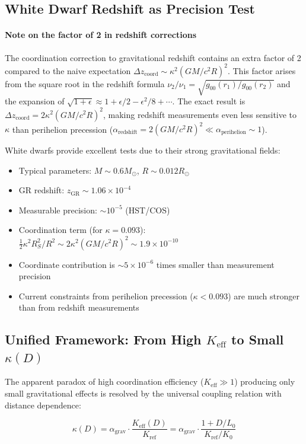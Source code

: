 \documentclass[11pt,a4paper]{article}
\begin{document}
	\subsection{White Dwarf Redshift as Precision Test}
	\paragraph{Note on the factor of 2 in redshift corrections}
	The coordination correction to gravitational redshift contains an extra factor of 2 compared to the naive expectation $\Delta z_{\text{coord}} \sim \kappa^2 (GM/c^2R)^2$. This factor arises from the square root in the redshift formula $\nu_2/\nu_1 = \sqrt{g_{00}(r_1)/g_{00}(r_2)}$ and the expansion of $\sqrt{1 + \epsilon} \approx 1 + \epsilon/2 - \epsilon^2/8 + \cdots$. The exact result is $\Delta z_{\text{coord}} = 2\kappa^2 (GM/c^2R)^2$, making redshift measurements even less sensitive to $\kappa$ than perihelion precession ($\alpha_{\text{redshift}} = 2(GM/c^2R)^2 \ll \alpha_{\text{perihelion}} \sim 1$).
	
	White dwarfs provide excellent tests due to their strong gravitational fields:
	\begin{itemize}
		\item Typical parameters: $M \sim 0.6 M_\odot$, $R \sim 0.012 R_\odot$
		\item GR redshift: $z_{\text{GR}} \sim 1.06\times10^{-4}$
		\item Measurable precision: $\sim 10^{-5}$ (HST/COS)
		\item Coordination term (for $\kappa = 0.093$): $\frac{1}{2}\kappa^2 R_S^2/R^2 \sim 2\kappa^2 (GM/c^2R)^2 \sim 1.9\times10^{-10}$
		\item Coordinate contribution is $\sim 5\times10^{-6}$ times smaller than measurement precision
		\item Current constraints from perihelion precession ($\kappa < 0.093$) are much stronger than from redshift measurements
	\end{itemize}
	\subsection{Unified Framework: From High $K_{\mathrm{eff}}$ to Small $\kappa(D)$}
	
	The apparent paradox of high coordination efficiency ($K_{\mathrm{eff}} \gg 1$) 
	producing only small gravitational effects is resolved by the universal coupling 
	relation with distance dependence:
	
	\begin{equation}
		\boxed{\kappa(D) = \alpha_{\text{grav}} \cdot \frac{K_{\mathrm{eff}}(D)}{K_{\text{ref}}} 
			= \alpha_{\text{grav}} \cdot \frac{1 + D/L_0}{K_{\text{ref}}/K_0}}
	\end{equation}
	
\end{document}

